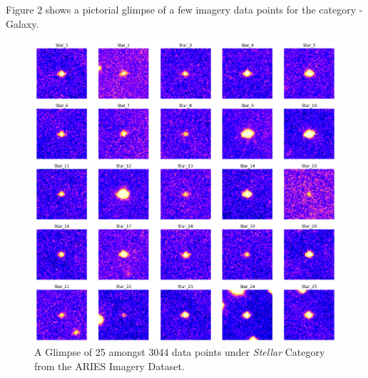 \documentclass[conference]{IEEEtran}
\begin{document}
Figure 2 shows a pictorial glimpse of a few imagery data points for the category - Galaxy. 
\begin{figure}[htbp]
\label{fig2}
\centerline{\includegraphics[width = \linewidth]{2}}
\caption{A Glimpse of 25 amongst 3044 data points under \textit{Stellar} Category from the ARIES Imagery Dataset. }
\end{figure}
\end{document}
